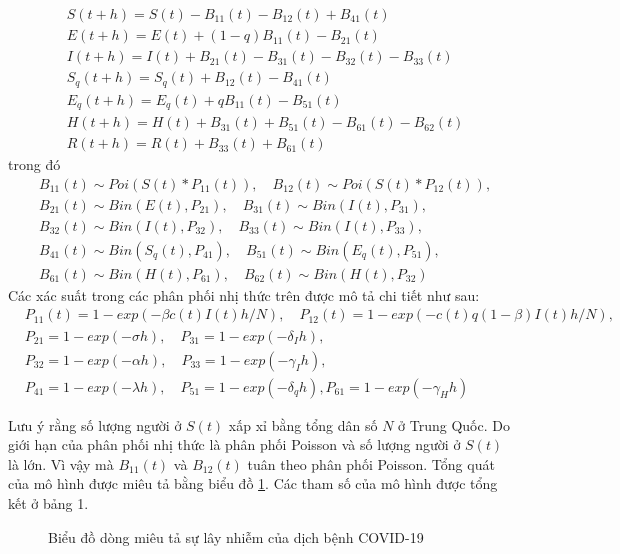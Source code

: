 \documentclass[../main.tex]{subfiles}
\begin{document}
\begin{align*}
    & S(t+h)=S(t)-B_{11}(t)-B_{12}(t)+B_{41}(t) \\
    & E(t+h)=E(t)+(1-q)B_{11}(t)-B_{21}(t) \\
    & I(t+h)=I(t)+B_{21}(t)-B_{31}(t)-B_{32}(t)-B_{33}(t) \\
    & S_q(t+h)=S_q(t)+B_{12}(t)-B_{41}(t) \\
    & E_q(t+h)=E_q(t)+qB_{11}(t)-B_{51}(t) \\
    & H(t+h)=H(t)+B_{31}(t)+B_{51}(t)-B_{61}(t)-B_{62}(t) \\
    & R(t+h)=R(t)+B_{33}(t)+B_{61}(t)
\end{align*}
trong đó
\begin{align*}
    & B_{11}(t) \sim Poi(S(t)*P_{11}(t)), \quad B_{12}(t) \sim Poi(S(t)*P_{12}(t)), \\
    & B_{21}(t) \sim Bin(E(t),P_{21}), \quad B_{31}(t) \sim Bin(I(t),P_{31}), \\
    & B_{32}(t) \sim Bin(I(t),P_{32}), \quad B_{33}(t) \sim Bin(I(t),P_{33}), \\
    & B_{41}(t) \sim Bin(S_q(t),P_{41}), \quad B_{51}(t) \sim Bin(E_q(t),P_{51}), \\
    & B_{61}(t) \sim Bin(H(t),P_{61}), \quad B_{62}(t) \sim Bin(H(t),P_{32})
\end{align*}
Các xác suất trong các phân phối nhị thức trên được mô tả chi tiết như sau:
\begin{align*}
    & P_{11}(t)=1-exp(-\beta c(t) I(t)h/N), \quad P_{12}(t)=1-exp(-c(t)q(1-\beta)I(t)h/N), \\
    & P_{21}=1-exp(-\sigma h), \quad P_{31}=1-exp(-\delta _I h), \\
    & P_{32}=1-exp(-\alpha h), \quad P_{33}=1-exp(-\gamma _I h), \\
    & P_{41}=1-exp(-\lambda h), \quad P_{51}=1-exp(-\delta _q h), P_{61}=1-exp(-\gamma _H h)
\end{align*}

Lưu ý rằng số lượng người ở $S(t)$ xấp xỉ bằng tổng dân số $N$ ở Trung Quốc. Do giới hạn của phân phối nhị thức là phân phối Poisson và số lượng người ở $S(t)$ là lớn. Vì vậy mà $B_{11}(t)$ và $B_{12}(t)$ tuân theo phân phối Poisson. Tổng quát của mô hình được miêu tả bằng biểu đồ \ref{diagram}. Các tham số của mô hình được tổng kết ở bảng 1.
\begin{figure}[H]
\centering
\resizebox{15cm}{!}{}
\caption{Biểu đồ dòng miêu tả sự lây nhiễm của dịch bệnh COVID-19}
\label{diagram}
\end{figure}
\end{document}
